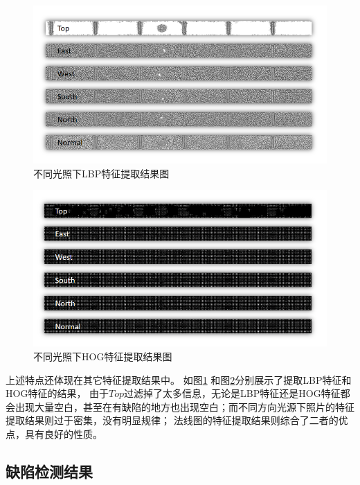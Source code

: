 \begin{figure}[htbp]
\centering
\includegraphics[width=1.0\linewidth]{figures/butongdengguanglbp.png}
\caption{不同光照下LBP特征提取结果图}
\label{fig:butongdengguanglbp}
\end{figure}
\begin{figure}[htbp]
\centering
\includegraphics[width=1.0\linewidth]{figures/butongengguanghog.png}
\caption{不同光照下HOG特征提取结果图}
\label{fig:butongengguanghog}
\end{figure}

上述特点还体现在其它特征提取结果中。
如图\ref{fig:butongdengguanglbp}
和图\ref{fig:butongengguanghog}分别展示了提取LBP特征和HOG特征的结果，
由于$Top$过滤掉了太多信息，无论是LBP特征还是HOG特征都会出现大量空白，甚至在有缺陷的地方也出现空白；而不同方向光源下照片的特征提取结果则过于密集，没有明显规律；
法线图的特征提取结果则综合了二者的优点，具有良好的性质。

\subsection{缺陷检测结果}
\label{subsection:chuantongjiancejieguo}

